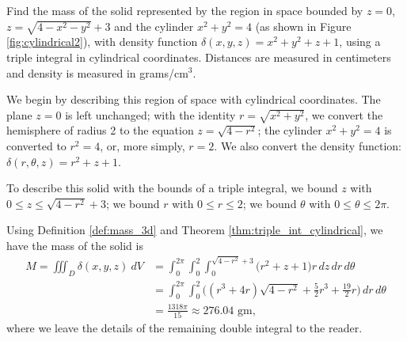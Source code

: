 {Find the mass of the solid represented by the region in space bounded by $z=0$, $z=\sqrt{4-x^2-y^2}+3$ and the cylinder $x^2+y^2=4$ (as shown in Figure \ref{fig:cylindrical2}), with density function $\delta(x,y,z) = x^2+y^2+z+1$, using a triple integral in cylindrical coordinates. Distances are measured in centimeters and density is measured in grams/cm$^3$.
}
{We begin by describing this region of space with cylindrical coordinates. The plane $z=0$ is left unchanged; with the identity $r=\sqrt{x^2+y^2}$, we convert the hemisphere of radius 2 to the equation $z=\sqrt{4-r^2}$; the cylinder $x^2+y^2=4$ is converted to $r^2=4$, or, more simply, $r=2$.  We also convert the density function: $\delta(r,\theta,z) = r^2+z+1$. 

To describe this solid with the bounds of a triple integral, we bound $z$ with $0\leq z\leq \sqrt{4-r^2}+3$; we bound $r$ with $0 \leq r \leq 2$; we bound $\theta$ with $0 \leq \theta \leq 2\pi$.

Using Definition \ref{def:mass_3d} and Theorem \ref{thm:triple_int_cylindrical}, we have the mass of the solid is
\begin{align*}
M=\iiint_D\delta(x,y,z)\ dV &= \int_0^{2\pi}\int_0^2\int_0^{\sqrt{4-r^2}+3}\big(r^2+z+1\big)r\,dz\,dr\,d\theta \\
&= \int_0^{2\pi}\int_0^2\big((r^3+4r)\sqrt{4-r^2}+\frac52r^3+\frac{19}2r\big)\,dr\,d\theta \\
&= \frac{1318\pi}{15} \approx 276.04\text{ gm},
\end{align*}
where we leave the details of the remaining double integral to the reader.
}\\


